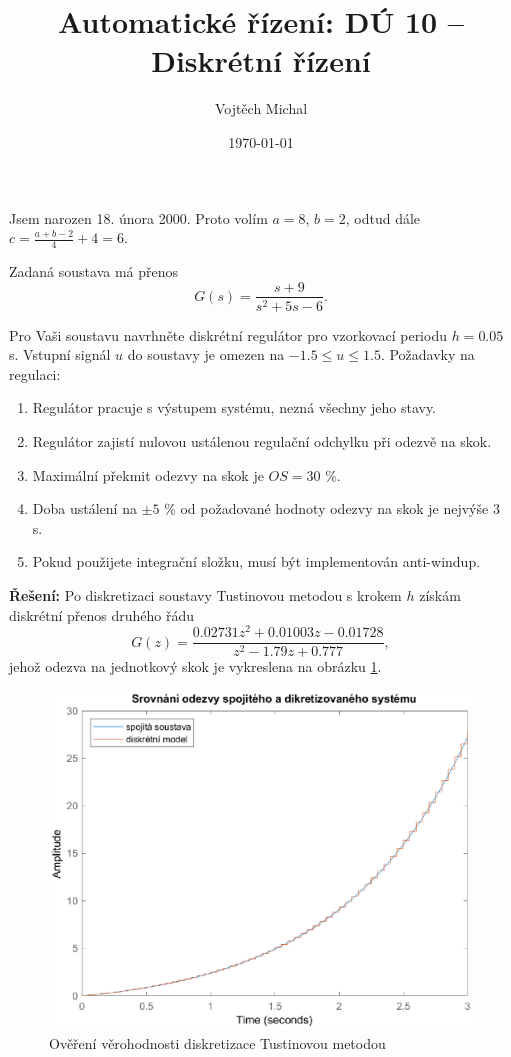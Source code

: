 \documentclass[twoside]{article}
\title{Automatické řízení: DÚ 10 -- Diskrétní řízení}
\author{Vojtěch Michal}
\date{\today}
\begin{document}
\maketitle

Jsem narozen 18. února 2000. Proto volím $a = 8$, $b = 2$, odtud dále $c = \frac{a+b-2}{4} + 4 = 6$.

Zadaná soustava má přenos 
\begin{equation}
	G(s) = \frac{s+9}{s^2+5s-6}.
\end{equation}

Pro Vaši soustavu navrhněte diskrétní regulátor pro vzorkovací periodu $h = 0.05$ \si{\second}. Vstupní signál $u$ do
soustavy je omezen na $-1.5 \le u \le 1.5$. Požadavky na regulaci:
\begin{enumerate}
	\item Regulátor pracuje s výstupem systému, nezná všechny jeho stavy.
	\item Regulátor zajistí nulovou ustálenou regulační odchylku při odezvě na skok.
	\item Maximální překmit odezvy na skok je $OS = 30$ \%.
	\item Doba ustálení na $\pm 5$ \% od požadované hodnoty odezvy na skok je nejvýše $3$ \si{\second}.
	\item Pokud použijete integrační složku, musí být implementován anti-windup.
\end{enumerate}


\textbf{Řešení:} Po diskretizaci soustavy Tustinovou metodou s krokem $h$ získám diskrétní přenos druhého řádu
\begin{equation}
	G(z) = \frac{  0.02731 z^2 + 0.01003 z - 0.01728}{  z^2 - 1.79 z + 0.777},
\end{equation}
jehož odezva na jednotkový skok je vykreslena na obrázku \ref{fig:porovnani}. 

\begin{figure}[htbp]
	\centering
	\includegraphics[width=.75\linewidth]{porovnani_nestabilni.eps}
	\caption{Ověření věrohodnosti diskretizace Tustinovou metodou}
	\label{fig:porovnani}
\end{figure}
\end{document}
